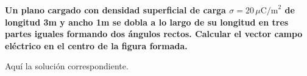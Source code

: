 \documentclass[12pt, answers]{exam}
\begin{document}
\begin{questions}
\begin{solution}
	\end{solution}


	\question \large\textbf{Un plano cargado con densidad superficial de carga \( \sigma = 20 \, \mu \text{C/m}^2 \) de longitud 3m y ancho 1m se dobla a lo largo de su longitud en tres partes iguales formando dos ángulos rectos. Calcular el vector campo eléctrico en el centro de la figura formada.}

	\begin{solution}
		Aquí la solución correspondiente.
	\end{solution}

\end{questions}
\end{document}
